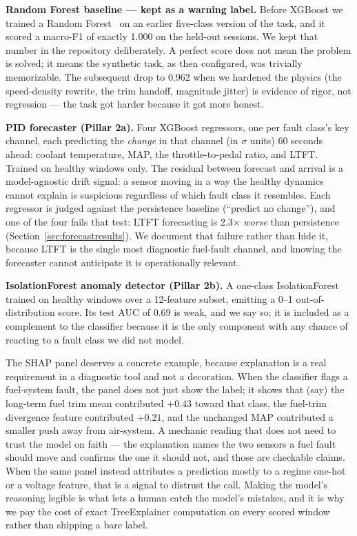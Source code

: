 \textbf{Random Forest baseline --- kept as a warning label.} Before XGBoost
we trained a Random Forest~\cite{breiman2001} on an earlier five-class
version of the task, and it scored a macro-F1 of exactly 1.000 on the
held-out sessions. We kept that number in the repository deliberately. A
perfect score does not mean the problem is solved; it means the synthetic
task, as then configured, was trivially memorizable. The subsequent drop to
0.962 when we hardened the physics (the speed-density rewrite, the trim
handoff, magnitude jitter) is evidence of rigor, not regression --- the
task got harder because it got more honest.

\textbf{PID forecaster (Pillar 2a).} Four XGBoost regressors, one per fault
class's key channel, each predicting the \emph{change} in that channel
(in $\sigma$ units) 60 seconds ahead: coolant temperature, MAP, the
throttle-to-pedal ratio, and LTFT. Trained on healthy windows only. The
residual between forecast and arrival is a model-agnostic drift signal: a
sensor moving in a way the healthy dynamics cannot explain is suspicious
regardless of which fault class it resembles. Each regressor is judged
against the persistence baseline (``predict no change''), and one of the
four fails that test: LTFT forecasting is 2.3$\times$ \emph{worse} than
persistence (Section~\ref{sec:forecastresults}). We document that failure
rather than hide it, because LTFT is the single most diagnostic fuel-fault
channel, and knowing the forecaster cannot anticipate it is operationally
relevant.

\textbf{IsolationForest anomaly detector (Pillar 2b).} A one-class
IsolationForest~\cite{liu2008} trained on healthy windows over a 12-feature
subset, emitting a 0--1 out-of-distribution score. Its test AUC of 0.69 is
weak, and we say so; it is included as a complement to the classifier
because it is the only component with any chance of reacting to a fault
class we did not model.

The SHAP panel deserves a concrete example, because explanation is a real
requirement in a diagnostic tool and not a decoration. When the classifier
flags a fuel-system fault, the panel does not just show the label; it shows
that (say) the long-term fuel trim mean contributed $+0.43$ toward that
class, the fuel-trim divergence feature contributed $+0.21$, and the
unchanged MAP contributed a smaller push away from air-system. A mechanic
reading that does not need to trust the model on faith --- the explanation
names the two sensors a fuel fault should move and confirms the one it
should not, and those are checkable claims. When the same panel instead
attributes a prediction mostly to a regime one-hot or a voltage feature,
that is a signal to distrust the call. Making the model's reasoning legible
is what lets a human catch the model's mistakes, and it is why we pay the
cost of exact TreeExplainer computation on every scored window rather than
shipping a bare label.

